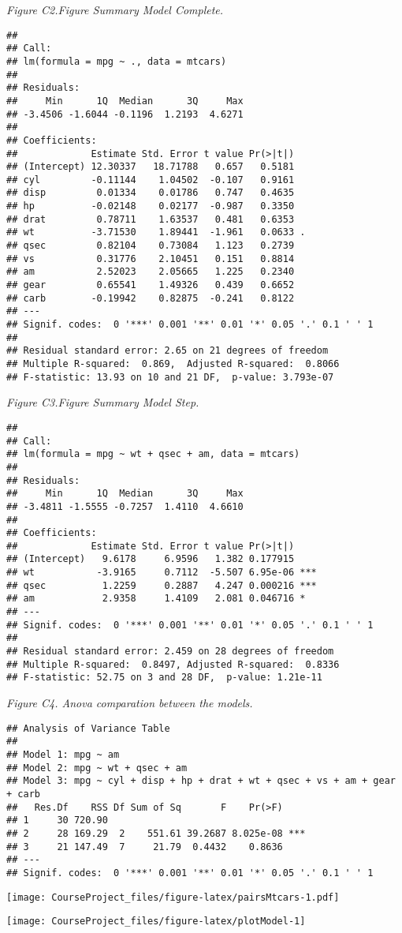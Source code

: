 \documentclass[11pt,]{article}
\begin{document}
\emph{Figure C2.Figure Summary Model Complete.}

\begin{verbatim}
## 
## Call:
## lm(formula = mpg ~ ., data = mtcars)
## 
## Residuals:
##     Min      1Q  Median      3Q     Max 
## -3.4506 -1.6044 -0.1196  1.2193  4.6271 
## 
## Coefficients:
##             Estimate Std. Error t value Pr(>|t|)  
## (Intercept) 12.30337   18.71788   0.657   0.5181  
## cyl         -0.11144    1.04502  -0.107   0.9161  
## disp         0.01334    0.01786   0.747   0.4635  
## hp          -0.02148    0.02177  -0.987   0.3350  
## drat         0.78711    1.63537   0.481   0.6353  
## wt          -3.71530    1.89441  -1.961   0.0633 .
## qsec         0.82104    0.73084   1.123   0.2739  
## vs           0.31776    2.10451   0.151   0.8814  
## am           2.52023    2.05665   1.225   0.2340  
## gear         0.65541    1.49326   0.439   0.6652  
## carb        -0.19942    0.82875  -0.241   0.8122  
## ---
## Signif. codes:  0 '***' 0.001 '**' 0.01 '*' 0.05 '.' 0.1 ' ' 1
## 
## Residual standard error: 2.65 on 21 degrees of freedom
## Multiple R-squared:  0.869,  Adjusted R-squared:  0.8066 
## F-statistic: 13.93 on 10 and 21 DF,  p-value: 3.793e-07
\end{verbatim}

\emph{Figure C3.Figure Summary Model Step.}

\begin{verbatim}
## 
## Call:
## lm(formula = mpg ~ wt + qsec + am, data = mtcars)
## 
## Residuals:
##     Min      1Q  Median      3Q     Max 
## -3.4811 -1.5555 -0.7257  1.4110  4.6610 
## 
## Coefficients:
##             Estimate Std. Error t value Pr(>|t|)    
## (Intercept)   9.6178     6.9596   1.382 0.177915    
## wt           -3.9165     0.7112  -5.507 6.95e-06 ***
## qsec          1.2259     0.2887   4.247 0.000216 ***
## am            2.9358     1.4109   2.081 0.046716 *  
## ---
## Signif. codes:  0 '***' 0.001 '**' 0.01 '*' 0.05 '.' 0.1 ' ' 1
## 
## Residual standard error: 2.459 on 28 degrees of freedom
## Multiple R-squared:  0.8497, Adjusted R-squared:  0.8336 
## F-statistic: 52.75 on 3 and 28 DF,  p-value: 1.21e-11
\end{verbatim}

\emph{Figure C4. Anova comparation between the models.}

\begin{verbatim}
## Analysis of Variance Table
## 
## Model 1: mpg ~ am
## Model 2: mpg ~ wt + qsec + am
## Model 3: mpg ~ cyl + disp + hp + drat + wt + qsec + vs + am + gear + carb
##   Res.Df    RSS Df Sum of Sq       F    Pr(>F)    
## 1     30 720.90                                   
## 2     28 169.29  2    551.61 39.2687 8.025e-08 ***
## 3     21 147.49  7     21.79  0.4432    0.8636    
## ---
## Signif. codes:  0 '***' 0.001 '**' 0.01 '*' 0.05 '.' 0.1 ' ' 1
\end{verbatim}

\texttt{[image: CourseProject\_files/figure-latex/pairsMtcars-1.pdf]}

\begin{center}\texttt{[image: CourseProject\_files/figure-latex/plotModel-1]} \end{center}
\end{document}
